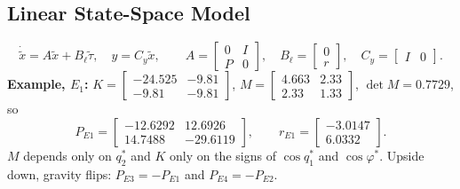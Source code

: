 \documentclass[12pt,a4paper]{article}
\begin{document}
\subsection{Linear State-Space Model}
\begin{equation}
\dot{\tilde x}=A\tilde x+B_\ell\tilde\tau,\quad y=C_y\tilde x,\qquad
A=\begin{bmatrix}0&I\\P&0\end{bmatrix},\quad B_\ell=\begin{bmatrix}0\\r\end{bmatrix},\quad C_y=\begin{bmatrix}I&0\end{bmatrix}.\label{eq:lin}
\end{equation}
\textbf{Example, $E_1$:} $K=\left[\begin{smallmatrix}-24.525&-9.81\\-9.81&-9.81\end{smallmatrix}\right]$, $M=\left[\begin{smallmatrix}4.663&2.33\\2.33&1.33\end{smallmatrix}\right]$, $\det M=0.7729$, so
\[
P_{E1}=\begin{bmatrix}-12.6292&12.6926\\14.7488&-29.6119\end{bmatrix},\qquad r_{E1}=\begin{bmatrix}-3.0147\\6.0332\end{bmatrix}.
\]
$M$ depends only on $q_2^*$ and $K$ only on the signs of $\cos q_1^*$ and $\cos\varphi^*$. Upside down, gravity flips: $P_{E3}=-P_{E1}$ and $P_{E4}=-P_{E2}$.
\end{document}
